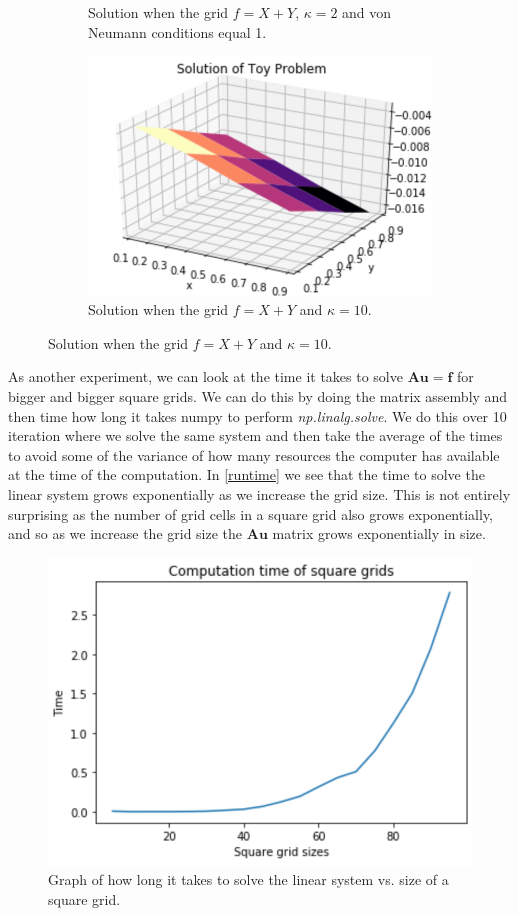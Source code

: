 \begin{figure}[H]
\begin{subfigure}[b]{0.45\linewidth}
		\caption{Solution when the grid $f = X+Y$, $\kappa = 2$ and von Neumann conditions equal 1.} 
		\label{e3}
	\end{subfigure}
	\hfill
	\begin{subfigure}[b]{0.45\linewidth}
		\centering
		\includegraphics[width=\linewidth]{Materials/k10}
		\caption{Solution when the grid $f = X+Y$ and $\kappa = 10$.\\\hfill} 
		\label{e4}
	\end{subfigure}
\end{figure} 
As another experiment, we can look at the time it takes to solve $\mathbf{Au} = \mathbf{f}$ for bigger and bigger square grids. We can do this by doing the matrix assembly and then time how long it takes numpy to perform \textit{np.linalg.solve}. We do this over 10 iteration where we solve the same system and then take the average of the times to avoid some of the variance of how many resources the computer has available at the time of the computation. In \autoref{runtime} we see that the time to solve the linear system grows exponentially as we increase the grid size. This is not entirely surprising as the number of grid cells in a square grid also grows exponentially, and so as we increase the grid size the $\mathbf{Au}$ matrix grows exponentially in size.

\begin{figure}[H]
	\centering
	\includegraphics[width=0.6\linewidth]{Materials/runtime}
	\caption{Graph of how long it takes to solve the linear system vs. size of a square grid.}
	\label{runtime}
\end{figure}